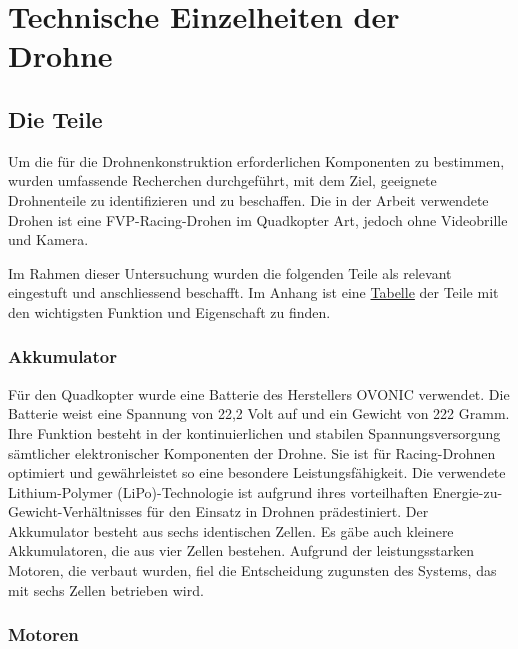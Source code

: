 \chapter{Technische Einzelheiten der Drohne} 
\section{Die Teile}\label{sec:Teile}

Um die für die Drohnenkonstruktion erforderlichen Komponenten zu bestimmen, wurden umfassende Recherchen durchgeführt, mit dem Ziel, geeignete Drohnenteile zu identifizieren und zu beschaffen. Die in der Arbeit verwendete Drohen ist eine FVP-Racing-Drohen\cite{FPV} im Quadkopter\cite{Quadkopter} Art, jedoch ohne Videobrille und Kamera. 

Im Rahmen dieser Untersuchung wurden die folgenden Teile als relevant eingestuft und anschliessend beschafft. Im Anhang ist eine \hyperref[ch:infoteile]{Tabelle} der Teile mit den wichtigsten Funktion und Eigenschaft zu finden.

\subsection{Akkumulator} \label{sec:Akku} 
Für den Quadkopter wurde eine Batterie des Herstellers OVONIC verwendet. Die Batterie weist eine Spannung von 22,2 Volt auf und ein Gewicht von 222 Gramm. Ihre Funktion besteht in der kontinuierlichen und stabilen Spannungsversorgung sämtlicher elektronischer Komponenten der Drohne. Sie ist für Racing-Drohnen optimiert und gewährleistet so eine besondere Leistungsfähigkeit. Die verwendete Lithium-Polymer (LiPo)-Technologie ist aufgrund ihres vorteilhaften Energie-zu-Gewicht-Verhältnisses für den Einsatz in Drohnen prädestiniert.\cite{Akku} Der Akkumulator besteht aus sechs identischen Zellen. Es gäbe auch kleinere Akkumulatoren, die aus vier Zellen bestehen. Aufgrund der leistungsstarken Motoren, die verbaut wurden, fiel die Entscheidung zugunsten des Systems, das mit sechs Zellen betrieben wird.

\subsection{Motoren}\label{sec:Motoren}

